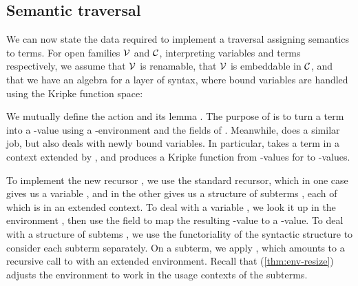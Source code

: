 \subsection{Semantic traversal}\label{sec:traversal}

We can now state the data required to implement a traversal assigning
semantics to terms. For open families $\V$ and $\C$, interpreting
variables and terms respectively, we assume that $\V$ is renamable,
that $\V$ is embeddable in $\C$, and that we have an algebra for a
layer of syntax, where bound variables are handled using the Kripke
function space:




We mutually define the action  and its lemma
.
The purpose of  is to turn a term into a
\AgdaBound{$\C$}-value using a \AgdaBound{$\V$}-environment and the fields of
.
Meanwhile,  does a similar job, but also deals with
newly bound variables.
In particular,  takes a term in a context extended by
\AgdaBound{$\Theta$}, and produces a Kripke function from
\AgdaBound{$\V$}-values for \AgdaBound{$\Theta$} to \AgdaBound{$\C$}-values.


To implement the new recursor , we use the standard
recursor, which in one case gives us a variable , and in the other
gives us a structure of subterms , each of which is in an extended
context.
To deal with a variable , we look it
up in the environment \AgdaBound{$\rho$}, then use the
 field to map the resulting
\AgdaBound{$\V$}-value to a \AgdaBound{$\C$}-value.
To deal with a structure of subtems , we use the functoriality of
the syntactic structure to consider each subterm separately.
On a subterm, we apply , which amounts to a recursive call
to  with an extended environment.
Recall that  (\cref{thm:env-resize}) adjusts the
environment \AgdaBound{$\rho$} to work in the usage contexts of the subterms.

